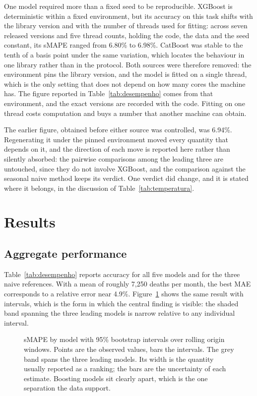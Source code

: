 One model required more than a fixed seed to be reproducible. XGBoost is deterministic
within a fixed environment, but its accuracy on this task shifts with the library version
and with the number of threads used for fitting: across seven released versions and five
thread counts, holding the code, the data and the seed constant, its sMAPE ranged from
6.80\% to 6.98\%. CatBoost was stable to the tenth of a basis point under the same
variation, which locates the behaviour in one library rather than in the protocol. Both
sources were therefore removed: the environment pins the library version, and the model is
fitted on a single thread, which is the only setting that does not depend on how many cores
the machine has. The figure reported in Table~\ref{tab:desempenho} comes from that
environment, and the exact versions are recorded with the code. Fitting on one thread costs
computation and buys a number that another machine can obtain.

The earlier figure, obtained before either source was controlled, was 6.94\%. Regenerating
it under the pinned environment moved every quantity that depends on it, and the direction
of each move is reported here rather than silently absorbed: the pairwise comparisons among
the leading three are untouched, since they do not involve XGBoost, and the comparison
against the seasonal naive method keeps its verdict. One verdict did change, and it is
stated where it belongs, in the discussion of Table~\ref{tab:temperatura}.

\section{Results}

\subsection{Aggregate performance}



Table~\ref{tab:desempenho} reports accuracy for all five models and for the three naive
references. With a mean of roughly 7{,}250 deaths per month, the best MAE corresponds to a
relative error near 4.9\%.
Figure~\ref{fig:smape} shows the same result with intervals, which is the form in which the
central finding is visible: the shaded band spanning the three leading models is narrow
relative to any individual interval.

\begin{figure}[htbp]
\centering

\caption{sMAPE by model with 95\% bootstrap intervals over rolling origin windows. Points
are the observed values, bars the intervals. The grey band spans the three leading models.
Its width is the quantity usually reported as a ranking; the bars are the uncertainty of
each estimate. Boosting models sit clearly apart, which is the one separation the data
support.}
\label{fig:smape}
\end{figure}

